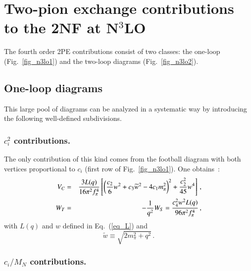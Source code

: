 \documentclass[sort&compress,preprint,3p]{elsarticle}
\begin{document}
\section{Two-pion exchange contributions to the 2NF at N$^3$LO
\label{app_N3LO}}

\setcounter{figure}{0}
\setcounter{table}{0}


The fourth order 2PE contributions consist of two classes: 
the one-loop (Fig.~\ref{fig_n3lo1}) and 
the two-loop diagrams (Fig.~\ref{fig_n3lo2}).

\subsection{One-loop diagrams}

This large pool of diagrams can be analyzed in a systematic
way by introducing the following well-defined
subdivisions.

\subsubsection{$c_i^2$ contributions.}

The only contribution of this kind comes from the football diagram 
with both
vertices proportional to $c_i$ (first row of
Fig.~\ref{fig_n3lo1}). One obtains~\cite{Kai01a}:
\begin{eqnarray}  
V_C & = & {3 L(q) \over 16 \pi^2 f_\pi^4 } 
\left[
\left( {c_2 \over 6} w^2 +c_3 \widetilde{w}^2 -4c_1 m_\pi^2 \right)^2 
+{c_2^2 \over 45 } w^4 
\right] \,, 
\label{eq_4c2C}
\\
W_T  &=&  -{1\over q^2} W_S 
     = {c_4^2 w^2 L(q) \over 96 \pi^2 f_\pi^4 } 
\,,
\label{eq_4c2T}
\end{eqnarray}
with $L(q)$ and $w$ defined in Eq.~(\ref{eq_L}) and
\begin{equation} 
\widetilde{w} \equiv  \sqrt{2m_\pi^2+q^2} \,. 
\end{equation}


\subsubsection{$c_i/M_N$ contributions.}
\end{document}
